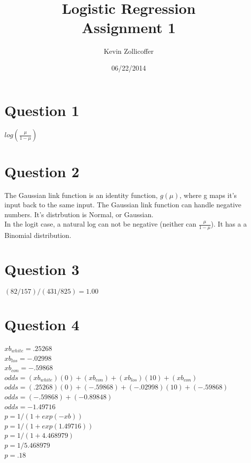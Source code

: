 \documentclass{article}
\author{Kevin Zollicoffer}
\title{Logistic Regression\\Assignment 1}
\date{06/22/2014}
\begin{document}
\maketitle


\section*{Question 1}
$ log(\frac{\mu}{1-\mu})$

\section*{Question 2}
The Gaussian link function is an identity function, $g(\mu)$, where g maps it's input back to the same input. The Gaussian link function can handle negative numbers. It's distrbution is Normal, or Gaussian. ~\\ 

In the logit case, a natural log can not be negative (neither can $\frac{\mu}{1-\mu}$). It has a a Binomial distribution. ~\\

\section*{Question 3}
$(82/157) / (431/825) = 1.00$

\section*{Question 4}
$xb_{white} = .25268$ ~\\
$xb_{los} = -.02998$ ~\\
$xb_{con} = -.59868$ ~\\

$odds = (xb_{white})(0)+(xb_{con})+(xb_{los})(10)+(xb_{con})$ ~\\
$odds = (.25268)(0)+(-.59868)+(-.02998)(10)+(-.59868)$ ~\\
$odds = (-.59868)+(-0.89848)$ ~\\
$odds = -1.49716$ ~\\

$p = 1/(1+exp(-xb))$ ~\\
$p = 1/(1+exp(1.49716))$ ~\\
$p = 1/(1+4.468979)$ ~\\
$p = 1/5.468979$ ~\\
$p = .18$ ~\\
\end{document}

